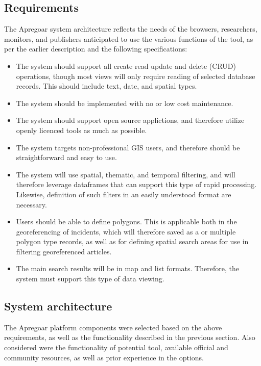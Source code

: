 	

\subsection{Requirements}

The Apregoar system architecture reflects the needs of the browsers, researchers, monitors, and publishers anticipated to use the various functions of the tool, as per the earlier description and the following specifications:

\begin{itemize}
	\item{} The system should support all create read update and delete (CRUD) operations, though most views will only require reading of selected database records. This should include text, date, and spatial types.
	\item{} The system should be implemented with no or low cost maintenance.
	\item{} The system should support open source applictions, and therefore utilize openly licenced tools as much as possible.
	\item{} The system targets non-professional GIS users, and therefore should be straightforward and easy to use.
	\item{} The system will use spatial, thematic, and temporal filtering, and will therefore leverage dataframes that can support this type of rapid processing. Likewise, definition of such filters in an easily understood format are necessary.
	\item{} Users should be able to define polygons. This is applicable both in the georeferencing of incidents, which will therefore saved as a or multiple polygon type records, as well as for defining spatial search areas for use in filtering georeferenced articles.
	\item{} The main search results will be in map and list formats. Therefore, the system must support this type of data viewing.
	
\end{itemize}
\subsection{System architecture}
The Apregoar platform components were selected based on the above requirements, as well as the functionality described in the previous section. Also considered were the functionality of potential tool, available official and community resources, as well as prior experience in the options.

